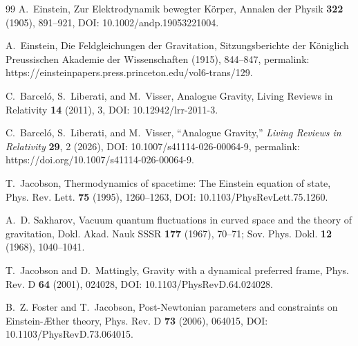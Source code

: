 \documentclass[11pt]{article}
\theoremstyle{definition}
\theoremstyle{plain}
\theoremstyle{remark}
\begin{document}
\begin{thebibliography}{99}
            A.~Einstein,
            \newblock Zur Elektrodynamik bewegter K{\"o}rper,
            \newblock Annalen der Physik \textbf{322} (1905), 891--921,
            \newblock DOI: 10.1002/andp.19053221004.

            A.~Einstein,
            \newblock Die Feldgleichungen der Gravitation,
            \newblock Sitzungsberichte der K{\"o}niglich Preussischen Akademie der Wissenschaften (1915), 844--847,
            \newblock permalink: https://einsteinpapers.press.princeton.edu/vol6-trans/129.

            C.~Barcel{\'o}, S.~Liberati, and M.~Visser,
            \newblock Analogue Gravity,
            \newblock Living Reviews in Relativity \textbf{14} (2011), 3,
            \newblock DOI: 10.12942/lrr-2011-3.

            C.~Barcel{\'o}, S.~Liberati, and M.~Visser,
            \newblock ``Analogue Gravity,''
            \newblock \textit{Living Reviews in Relativity} \textbf{29}, 2 (2026),
            \newblock DOI: 10.1007/s41114-026-00064-9,
            \newblock permalink: https://doi.org/10.1007/s41114-026-00064-9.

            T.~Jacobson,
            \newblock Thermodynamics of spacetime: The Einstein equation of state,
            \newblock Phys. Rev. Lett. \textbf{75} (1995), 1260--1263,
            \newblock DOI: 10.1103/PhysRevLett.75.1260.

            A.~D. Sakharov,
            \newblock Vacuum quantum fluctuations in curved space and the theory of gravitation,
            \newblock Dokl. Akad. Nauk SSSR \textbf{177} (1967), 70--71;
            \newblock Sov. Phys. Dokl. \textbf{12} (1968), 1040--1041.

            T.~Jacobson and D.~Mattingly,
            \newblock Gravity with a dynamical preferred frame,
            \newblock Phys. Rev. D \textbf{64} (2001), 024028,
            \newblock DOI: 10.1103/PhysRevD.64.024028.

            B.~Z. Foster and T.~Jacobson,
            \newblock Post-Newtonian parameters and constraints on Einstein-\AE ther theory,
            \newblock Phys. Rev. D \textbf{73} (2006), 064015,
            \newblock DOI: 10.1103/PhysRevD.73.064015.


\end{thebibliography}
\end{document}
